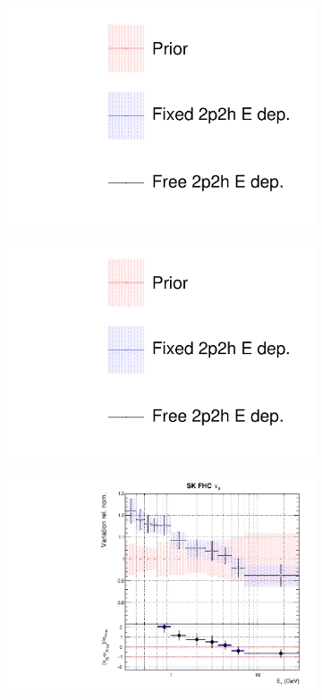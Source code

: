 \begin{figure}
\centering
\begin{subfigure}{0.3\textwidth}
  \centering
  \includegraphics[width=1.0\linewidth, trim={5mm  130mm 0mm 10mm}, clip]{figs/fixed2p2hfits_leg}
\end{subfigure}\begin{subfigure}{0.3\textwidth}
  \centering
  \includegraphics[width=1.0\linewidth, trim={5mm  0mm 0mm 70mm}, clip]{figs/fixed2p2hfits_leg}
\end{subfigure}
\begin{subfigure}{0.45\textwidth}
  \centering
  \includegraphics[width=0.75\linewidth]{figs/fixed2p2hflux8}

\end{subfigure}
\end{figure}
